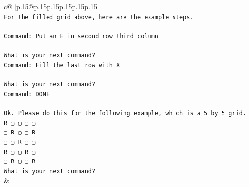 \documentclass{article}
\begin{document}
{\begin{supertabular}{c@{$\;$}|p{.15\linewidth}@{}p{.15\linewidth}p{.15\linewidth}p{.15\linewidth}p{.15\linewidth}p{.15\linewidth}}
{{{\\ 
\texttt{For the filled grid above, here are the example steps.} \\
\\ 
\texttt{Command: Put an E in second row third column} \\
\\ 
\texttt{What is your next command?} \\
\texttt{Command: Fill the last row with X} \\
\\ 
\texttt{What is your next command?} \\
\texttt{Command: DONE} \\
\\ 
\texttt{Ok. Please do this for the following example, which is a 5 by 5 grid.} \\
\texttt{R ▢ ▢ ▢ ▢} \\
\texttt{▢ R ▢ ▢ R} \\
\texttt{▢ ▢ R ▢ ▢} \\
\texttt{R ▢ ▢ R ▢} \\
\texttt{▢ R ▢ ▢ R} \\
\texttt{What is your next command?} \\
            }
        }
    }
    & \\ \\


\end{supertabular}}
\end{document}

